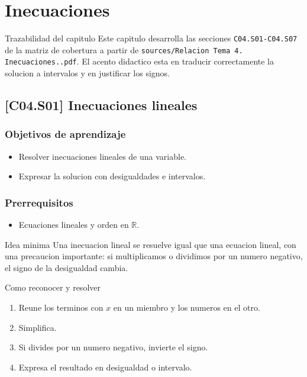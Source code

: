 \chapter{Inecuaciones}

\begin{theorybox}{Trazabilidad del capitulo}
Este capitulo desarrolla las secciones \texttt{C04.S01-C04.S07} de la matriz de cobertura a
partir de \texttt{sources/Relacion Tema 4. Inecuaciones..pdf}. El acento didactico esta en
traducir correctamente la solucion a intervalos y en justificar los signos.
\end{theorybox}

\section{[C04.S01] Inecuaciones lineales}

\subsection*{Objetivos de aprendizaje}
\begin{itemize}
  \item Resolver inecuaciones lineales de una variable.
  \item Expresar la solucion con desigualdades e intervalos.
\end{itemize}

\subsection*{Prerrequisitos}
\begin{itemize}
  \item Ecuaciones lineales y orden en \(\mathbb{R}\).
\end{itemize}

\begin{theorybox}{Idea minima}
Una inecuacion lineal se resuelve igual que una ecuacion lineal, con una precaucion importante:
si multiplicamos o dividimos por un numero negativo, el signo de la desigualdad cambia.
\end{theorybox}

\begin{methodbox}{Como reconocer y resolver}
\begin{enumerate}
  \item Reune los terminos con \(x\) en un miembro y los numeros en el otro.
  \item Simplifica.
  \item Si divides por un numero negativo, invierte el signo.
  \item Expresa el resultado en desigualdad o intervalo.
\end{enumerate}
\end{methodbox}

